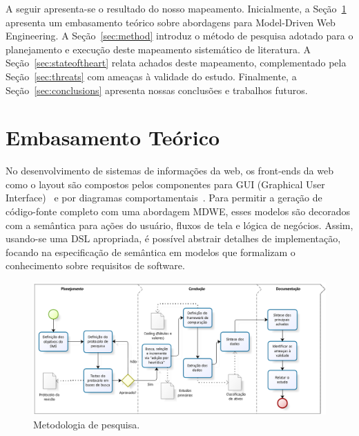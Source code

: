 A seguir apresenta-se o resultado do nosso mapeamento. Inicialmente, a Seção~\ref{sec:embteorico} apresenta um embasamento teórico sobre abordagens para Model-Driven Web Engineering. A Seção~\ref{sec:method} introduz o método de pesquisa adotado para o planejamento e execução deste mapeamento sistemático de literatura. A Seção~\ref{sec:stateoftheart} relata achados deste mapeamento, complementado pela Seção~\ref{sec:threats} com ameaças à validade do estudo. Finalmente, a Seção~\ref{sec:conclusions} apresenta nossas conclusões e trabalhos futuros.

\section{Embasamento Teórico}
\label{sec:embteorico}

No desenvolvimento de sistemas de informações da web, os front-ends da web como o layout são compostos pelos componentes para GUI (Graphical User Interface)~\cite{MIJAILOVIC2014757} e por diagramas comportamentais~\cite{Nunes06}. Para permitir a geração de código-fonte completo com uma abordagem MDWE, esses modelos são decorados com a semântica para ações do usuário, fluxos de tela e lógica de negócios. Assim, usando-se uma DSL apropriada, é possível abstrair detalhes de implementação, focando na especificação de semântica em modelos que formalizam o conhecimento sobre requisitos de software. %

\begin{figure}[ht!]
    \centering
    \includegraphics[width=540pt]{./mdweresearchmethod.png}
    \caption{Metodologia de pesquisa.}
    \label{fig:method}
\end{figure}

